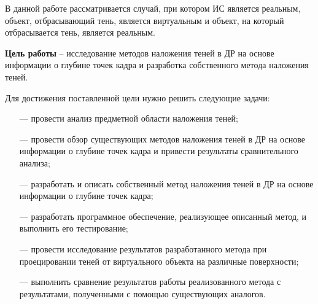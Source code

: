 В данной работе рассматривается случай, при котором ИС является реальным, объект, отбрасывающий тень, является виртуальным и объект, на который отбрасывается тень, является реальным.

\textbf{Цель работы} -- исследование методов наложения теней в ДР на основе информации о глубине точек кадра и разработка собственного метода наложения теней.

Для достижения поставленной цели нужно решить следующие задачи:

\begin{itemize}
	\item[---] провести анализ предметной области наложения теней;
	\item[---] провести обзор существующих методов наложения теней в ДР на основе информации о глубине точек кадра и привести результаты сравнительного анализа;
	\item[---] разработать и описать собственный метод наложения теней в ДР на основе информации о глубине точек кадра;
	\item[---] разработать программное обеспечение, реализующее описанный метод, и выполнить его тестирование;
	\item[---] провести исследование результатов разработанного метода при проецировании теней от виртуального объекта на различные поверхности;
	\item[---] выполнить сравнение результатов работы реализованного метода с результатами, полученными с помощью существующих аналогов.
\end{itemize}